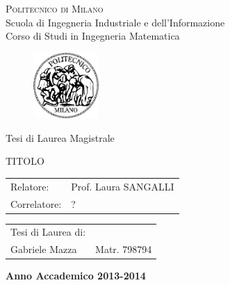 \documentclass[a4paper,11pt,twoside,openright]{book}							%
\date{28 Luglio 2014}
\author{Gabriele Mazza}
\title{}
\begin{document}
\thispagestyle{empty}
\enlargethispage{60mm}
\begin{center}
\LARGE{\textsc{Politecnico di Milano}}\\
\vspace{5mm}
\large{Scuola di Ingegneria Industriale e dell'Informazione}\\
\vspace{5mm}
\large{Corso di Studi in Ingegneria Matematica}\\
\vspace{10mm}
\begin{figure}[h]
	\begin{center}
	\includegraphics[width=25mm]{Immagini/Logo.png}
	\end{center}
	\end{figure}
\vspace{5mm}
\large{Tesi di Laurea Magistrale}\\
\vspace{10mm}

\begin{LARGE}
TITOLO
\end{LARGE}
\vspace{30mm}

\begin{flushleft}
\begin{tabular}{l l }
Relatore:    & Prof. Laura SANGALLI \\
Correlatore: & ?
\end{tabular}
\end{flushleft}
\vspace{12mm}
\begin{flushright}
\begin{tabular}{l l }
Tesi di Laurea di: & \\
Gabriele Mazza & Matr. 798794 \\
\end{tabular}
\end{flushright}
\vspace{12mm}
{\large{\bf Anno Accademico 2013-2014}}
\end{center}
\newpage
\thispagestyle{empty}
\end{document}

